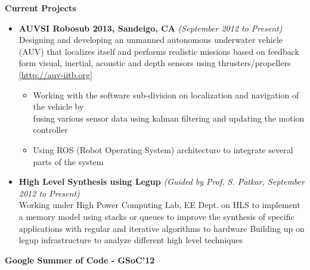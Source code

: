 \documentclass[a4paper,11pt]{article}
\newcommand{\resheading}[1]{{\small \colorbox{mygrey}{\begin{minipage}{0.975\textwidth}{\textbf{#1 \vphantom{p\^{E}}}}\end{minipage}}}}
\begin{document}
\resheading{\textbf{\large{Current Projects}}}
\begin{itemize}
    \item \textbf{AUVSI Robosub 2013, Sandeigo, CA} \hfill \emph{(September 2012 to Present) } \\
	Designing and developing an unmanned autonomous underwater vehicle (AUV) that localizes itself and performs realistic missions based on feedback form visual, inertial, acoustic and depth sensors using thrusters/propellers \hfill  [\url{http://auv-iitb.org}]
        \begin{itemize}
            \item Working with the software sub-division on localization and navigation of the vehicle  by \\ fusing various sensor data using kalman filtering and updating the motion controller
            \item Using ROS (Robot Operating System) architecture to integrate several parts of the system
        \end{itemize}
    \item \textbf{ High Level Synthesis using Legup} \hfill \emph{(Guided by Prof. S. Patkar, September 2012 to Present) }  \\
    Working under High Power Computing Lab, EE Dept. on HLS to implement a memory model using stacks or queues to improve the synthesis of specific applications with regular and iterative algorithms to hardware
    Building up on legup infrastructure to analyze different high level techniques
   

\end{itemize}

\resheading{\textbf{\large Google Summer of Code - GSoC'12}} \\
\end{document}
